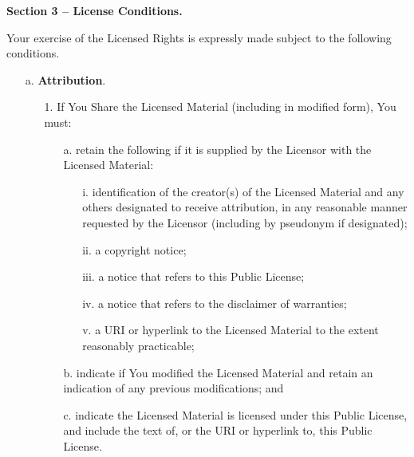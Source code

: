 \textbf{Section 3 -- License Conditions.}

Your exercise of the Licensed Rights is expressly made subject to the
following conditions.

\begin{enumerate}

	\item[a.] \textbf{Attribution}.

	\begin{enumerate}

		\item[1.] If You Share the Licensed Material (including in modified
		form), You must:

		\begin{enumerate}

			\item[a.] retain the following if it is supplied by the Licensor
			with the Licensed Material:

			\begin{enumerate}

				\item[i.] identification of the creator(s) of the Licensed
				Material and any others designated to receive
				attribution, in any reasonable manner requested by
				the Licensor (including by pseudonym if
				designated);

				\item[ii.] a copyright notice;

				\item[iii.] a notice that refers to this Public License;

				\item[iv.] a notice that refers to the disclaimer of
				warranties;

				\item[v.] a URI or hyperlink to the Licensed Material to the
				extent reasonably practicable;

			\end{enumerate}

			\item[b.] indicate if You modified the Licensed Material and
			retain an indication of any previous modifications; and

			\item[c.] indicate the Licensed Material is licensed under this
			Public License, and include the text of, or the URI or
			hyperlink to, this Public License.

		\end{enumerate}


\end{enumerate}
\end{enumerate}

